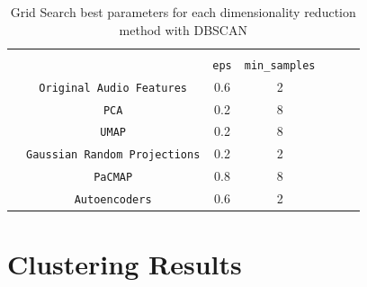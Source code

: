 \begin{appendix}
\begin{table}
\begin{center}
\begin{tabular}{c|c|c|c|ccc}
\multicolumn{2}{c}{} & \multicolumn{5}{c}{} \\ \cline{3-4}
\multicolumn{2}{c|}{} & \texttt{eps} & \texttt{min\_samples} & \\ \cline{2-4}
& \texttt{Original Audio Features} & 0.6 & 2 & & & \\ \cline{2-4}
 & \texttt{PCA} & 0.2 & 8 & & & \\ \cline{2-4}
& \texttt{UMAP} & 0.2 & 8 & & & \\ \cline{2-4}
& \texttt{Gaussian Random Projections} & 0.2 & 2 & & & \\ \cline{2-4}
& \texttt{PaCMAP}  & 0.8 & 8 & & & \\ \cline{2-4}
& \texttt{Autoencoders}  & 0.6 & 2 & & & \\ \cline{2-4}
\end{tabular}
\end{center}
\caption{Grid Search best parameters for each dimensionality reduction method with DBSCAN}
\end{table}

\section{Clustering Results}
\label{appendix:C}

\end{appendix}
